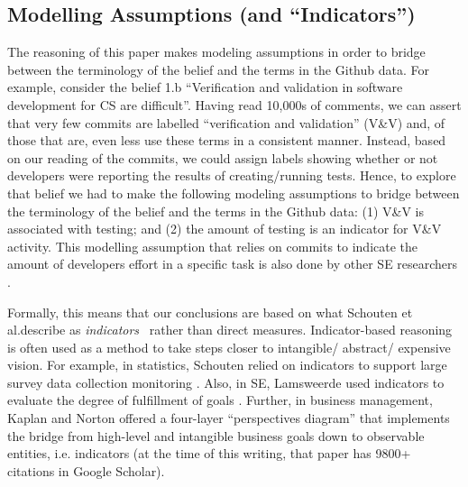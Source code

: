 \documentclass[sigconf,review,anonymous]{acmart}
\begin{document}

\subsection{Modelling Assumptions (and ``Indicators'')}\label{model}

The reasoning of this 
paper makes
modeling assumptions in order to bridge between the terminology of the belief and the terms in the Github data.  For example, consider the belief 1.b ``Verification and validation in software development for CS are difficult''.  
Having read 10,000s of comments, we can assert that 
very few commits are labelled  ``verification and validation'' (V\&V) and, of those that are,
even less use these terms in a consistent manner. Instead, based on our reading of the commits, we could assign labels showing whether or not developers were reporting the results of creating/running tests. Hence, to explore that belief we had to make the following modeling assumptions to bridge between the terminology of the belief and the terms in the Github data: (1) V\&V is associated with testing; and (2) the amount of testing is an indicator for V\&V activity. This modelling assumption that relies on commits to indicate the amount of developers effort in a specific  task is also done by other SE researchers \cite{vasilescu16_limit, xia2019sequential}.


Formally, this means that our conclusions are based on what
Schouten et al.describe as
 {\em indicators}~\cite{schouten2010indicators} rather than direct measures. Indicator-based reasoning is often used as a method to take steps closer to intangible/ abstract/ expensive vision. For example,
 in statistics, Schouten relied on indicators to support large survey data collection monitoring \cite{schouten2010indicators}. Also, in SE, Lamsweerde used indicators to evaluate the degree of fulfillment of goals \cite{vanLamsweerde2009_requirement}.
 Further, in business 
 management, Kaplan and Norton \cite{kaplan1996using} offered a four-layer ``perspectives diagram'' that implements the bridge from high-level and intangible business goals down
 to observable entities, i.e. indicators (at the time of this
 writing, that paper has  9800+ citations in Google Scholar).
   
\end{document}
